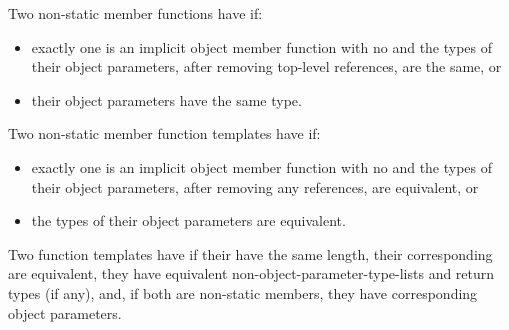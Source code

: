 \pnum
Two non-static member functions have
 if:
\begin{itemize}
\item
exactly one is an implicit object member function
with no  and
the types of their object parameters,
after removing top-level references,
are the same, or
\item
their object parameters have the same type.
\end{itemize}
%
Two non-static member function templates have
 if:
\begin{itemize}
\item
exactly one is an implicit object member function
with no  and
the types of their object parameters,
after removing any references,
are equivalent, or
\item
the types of their object parameters are equivalent.
\end{itemize}
%
Two function templates have
 if
their 
have the same length,
their corresponding  are equivalent,
they have equivalent non-object-parameter-type-lists and return types (if any), and,
if both are non-static members, they have corresponding object parameters.

